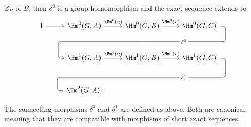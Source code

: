 \begin{theorem}
\begin{enumerate}[(i)]
		$Z_B$ of $B$, then $\delta^0$ is a group homomorphism and the exact
		sequence extends to
		\begin{equation*}\begin{tikzcd}[row sep=large]
			1 \arrow[r] & \Hm^0(G, A) \arrow[r, "{\Hm^0(u)}"] & \Hm^0(G, B) \arrow[r, "{\Hm^0(v)}"] \arrow[phantom, d, ""{coordinate, name=A}] & \Hm^0(G, C) \arrow[dll, rounded corners, "{\delta^0}" description, to path={
				-- ([xshift=2ex]\tikztostart.east)
				|- (A) [near end]\tikztonodes
				-| ([xshift=-2ex]\tikztotarget.west)
				-- (\tikztotarget)}] \\
			& \Hm^1(G, A) \arrow[r, "{\Hm^1(u)}"] & \Hm^1(G, B) \arrow[r, "{\Hm^1(v)}"] \arrow[phantom, d, ""{coordinate, name=B}] & \Hm^1(G, C) \arrow[dll, rounded corners, "{\delta^1}" description, to path={
				-- ([xshift=2ex]\tikztostart.east)
				|- (B) [near end]\tikztonodes
				-| ([xshift=-2ex]\tikztotarget.west)
				-- (\tikztotarget)}] \\
			& \Hm^2(G, A) . & {} & {}
		\end{tikzcd}\end{equation*}
	\end{enumerate}

	The connecting morphisms $\delta^0$ and $\delta^1$ are defined as above.
	Both are canonical, meaning that they are compatible with morphisms of
	short exact sequences.
\end{theorem}
